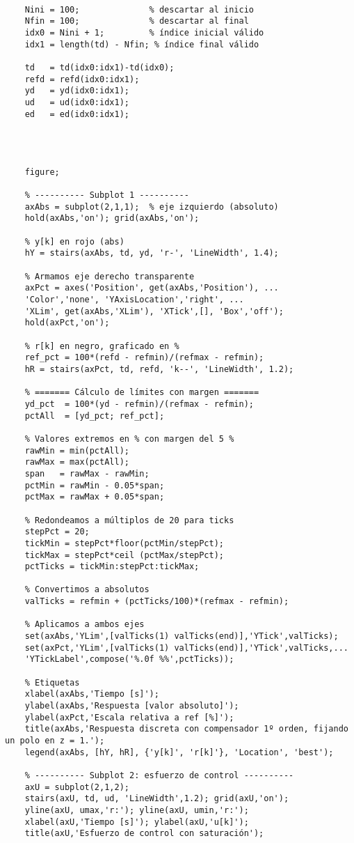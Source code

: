 \begin{lstlisting}[style=matlabstyle,caption={Primera hoja de cálculos utilizada.},label={matlab:calculo1}]
	
	Nini = 100;              % descartar al inicio
	Nfin = 100;              % descartar al final
	idx0 = Nini + 1;         % índice inicial válido
	idx1 = length(td) - Nfin; % índice final válido
	
	td   = td(idx0:idx1)-td(idx0);
	refd = refd(idx0:idx1);
	yd   = yd(idx0:idx1);
	ud   = ud(idx0:idx1);
	ed   = ed(idx0:idx1);
	
	
	
	
	figure;
	
	% ---------- Subplot 1 ----------
	axAbs = subplot(2,1,1);  % eje izquierdo (absoluto)
	hold(axAbs,'on'); grid(axAbs,'on');
	
	% y[k] en rojo (abs)
	hY = stairs(axAbs, td, yd, 'r-', 'LineWidth', 1.4);
	
	% Armamos eje derecho transparente
	axPct = axes('Position', get(axAbs,'Position'), ...
	'Color','none', 'YAxisLocation','right', ...
	'XLim', get(axAbs,'XLim'), 'XTick',[], 'Box','off');
	hold(axPct,'on');
	
	% r[k] en negro, graficado en %
	ref_pct = 100*(refd - refmin)/(refmax - refmin);
	hR = stairs(axPct, td, refd, 'k--', 'LineWidth', 1.2);
	
	% ======= Cálculo de límites con margen =======
	yd_pct  = 100*(yd - refmin)/(refmax - refmin);
	pctAll  = [yd_pct; ref_pct];
	
	% Valores extremos en % con margen del 5 %
	rawMin = min(pctAll);
	rawMax = max(pctAll);
	span   = rawMax - rawMin;
	pctMin = rawMin - 0.05*span;
	pctMax = rawMax + 0.05*span;
	
	% Redondeamos a múltiplos de 20 para ticks
	stepPct = 20;
	tickMin = stepPct*floor(pctMin/stepPct);
	tickMax = stepPct*ceil (pctMax/stepPct);
	pctTicks = tickMin:stepPct:tickMax;
	
	% Convertimos a absolutos
	valTicks = refmin + (pctTicks/100)*(refmax - refmin);
	
	% Aplicamos a ambos ejes
	set(axAbs,'YLim',[valTicks(1) valTicks(end)],'YTick',valTicks);
	set(axPct,'YLim',[valTicks(1) valTicks(end)],'YTick',valTicks,...
	'YTickLabel',compose('%.0f %%',pctTicks));
	
	% Etiquetas
	xlabel(axAbs,'Tiempo [s]');
	ylabel(axAbs,'Respuesta [valor absoluto]');
	ylabel(axPct,'Escala relativa a ref [%]');
	title(axAbs,'Respuesta discreta con compensador 1º orden, fijando un polo en z = 1.');
	legend(axAbs, [hY, hR], {'y[k]', 'r[k]'}, 'Location', 'best');
	
	% ---------- Subplot 2: esfuerzo de control ----------
	axU = subplot(2,1,2);
	stairs(axU, td, ud, 'LineWidth',1.2); grid(axU,'on');
	yline(axU, umax,'r:'); yline(axU, umin,'r:');
	xlabel(axU,'Tiempo [s]'); ylabel(axU,'u[k]');
	title(axU,'Esfuerzo de control con saturación');
	

\end{lstlisting}
